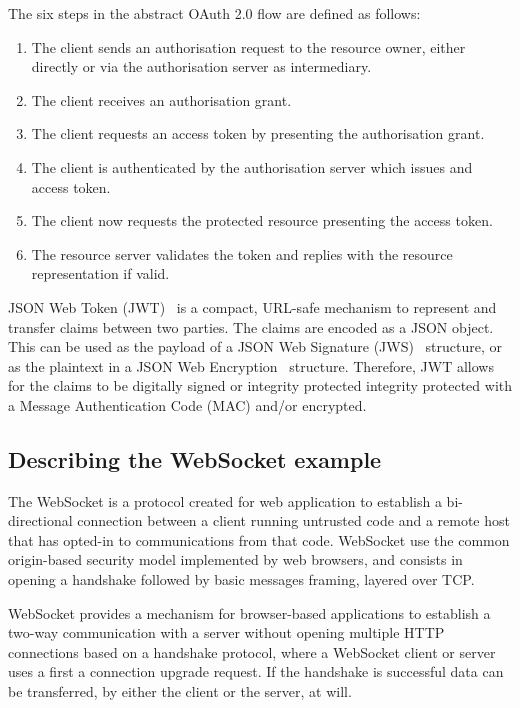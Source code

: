 The six steps in the abstract OAuth 2.0 flow are defined as follows:
\begin{enumerate}
    \item The client sends an authorisation request to the resource owner, either directly or via the authorisation server as intermediary.
    \item The client receives an authorisation grant.
    \item The client requests an access token by presenting the authorisation grant.
    \item The client is authenticated by the authorisation server which issues and access token.
    \item The client now requests the protected resource presenting the access token.
    \item The resource server validates the token and replies with the resource representation if valid.
\end{enumerate}

JSON Web Token (JWT)~\cite{jones2015json} is a compact, URL-safe mechanism to represent and transfer claims between two parties. The claims are encoded as a JSON object. This can be used as the payload of a JSON Web Signature (JWS)~\cite{jones2014n} structure, or as the plaintext in a JSON Web Encryption~\cite{jones2015jwe} structure. Therefore, JWT allows for the claims to be digitally signed or integrity protected integrity protected with a Message Authentication Code (MAC) and/or encrypted.

\subsection{Describing the WebSocket example}

The WebSocket is a protocol created for web application to establish a bi-directional connection between a client running untrusted code and a remote host that has opted-in to communications from that code. 
WebSocket use the common origin-based security model implemented by web browsers, and consists in opening a handshake followed by basic messages framing, layered over TCP.

WebSocket provides a mechanism for browser-based applications to establish a two-way communication with a server without opening multiple HTTP connections based on a handshake protocol, where a WebSocket client or server uses a first a connection upgrade request. If the handshake is successful data can be transferred, by either the client or the server, at will.

